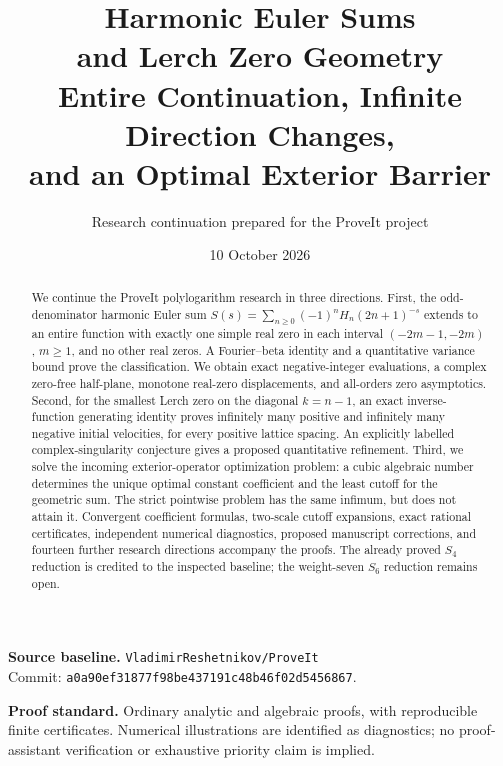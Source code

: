 \documentclass[11pt,a4paper]{article}
\title{\vspace{-1.5em}\color{navy}\textbf{Harmonic Euler Sums\\and Lerch Zero Geometry}\\[.65em]
\large Entire Continuation, Infinite Direction Changes,\\
and an Optimal Exterior Barrier}
\author{Research continuation prepared for the ProveIt project}
\date{10 October 2026}
\theoremstyle{definition}
\theoremstyle{remark}
\numberwithin{equation}{section}
\begin{document}
\maketitle
\thispagestyle{empty}
\begin{abstract}
We continue the ProveIt polylogarithm research in three directions.
First, the odd-denominator harmonic Euler sum
$S(s)=\sum_{n\ge0}(-1)^nH_n(2n+1)^{-s}$ extends to an entire
function with exactly one simple real zero in each interval
$(-2m-1,-2m)$, $m\ge1$, and no other real zeros. A Fourier--beta
identity and a quantitative variance bound prove the classification.
We obtain exact negative-integer evaluations, a complex zero-free
half-plane, monotone real-zero displacements, and all-orders zero
asymptotics.
Second, for the smallest Lerch zero on the diagonal $k=n-1$,
an exact inverse-function generating identity proves infinitely many
positive and infinitely many negative initial velocities, for every
positive lattice spacing. An explicitly labelled complex-singularity
conjecture gives a proposed quantitative refinement.
Third, we solve the incoming exterior-operator optimization problem:
a cubic algebraic number determines the unique optimal constant
coefficient and the least cutoff for the geometric sum. The strict
pointwise problem has the same infimum, but does not attain it.
Convergent coefficient formulas, two-scale cutoff expansions, exact
rational certificates, independent numerical diagnostics, proposed
manuscript corrections, and fourteen further research directions
accompany the proofs.
The already proved $S_4$ reduction is credited to the inspected
baseline; the weight-seven $S_6$ reduction remains open.
\end{abstract}

\vfill
\noindent\textbf{Source baseline.}\quad
\texttt{VladimirReshetnikov/ProveIt}\\
Commit:
\texttt{a0a90ef31877f98be437191c48b46f02d5456867}.

\medskip
\noindent\textbf{Proof standard.}\quad
Ordinary analytic and algebraic proofs, with reproducible finite
certificates. Numerical illustrations are identified as diagnostics;
no proof-assistant verification or exhaustive priority claim is implied.
\clearpage
\begingroup
\small
\tableofcontents
\endgroup
\clearpage








\end{document}
